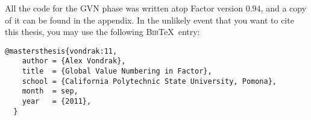 All the code for the \gls{GVN} phase was written atop Factor version $0.94$,
and a copy of it can be found in the appendix.  In the unlikely event
that you want to cite this thesis, you may use the following
\textsc{Bib}\TeX~entry:
\begin{Verbatim}[gobble=2,frame=single]
  @mastersthesis{vondrak:11,
    author = {Alex Vondrak},
    title  = {Global Value Numbering in Factor},
    school = {California Polytechnic State University, Pomona},
    month  = sep,
    year   = {2011},
  }
\end{Verbatim}


